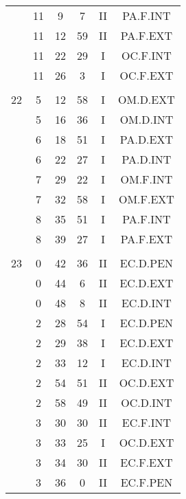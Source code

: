 \documentclass[12pt, a4paper]{article}
\begin{document}
\begin{multicols}{3}
{\begin{tabular}{c c c c c c}
	 	 	 	 & 11 & 9 & 7 & II & PA.F.INT\\%
	 	 	 	 & 11 & 12 & 59 & II & PA.F.EXT\\%
	 	 	 	 & 11 & 22 & 29 & I & OC.F.INT\\%
	 	 	 	 & 11 & 26 & 3 & I & OC.F.EXT\\%
	 	 	 	 & & & & & \\%
	 	 	 	22 & 5 & 12 & 58 & I & OM.D.EXT\\%
	 	 	 	 & 5 & 16 & 36 & I & OM.D.INT\\%
	 	 	 	 & 6 & 18 & 51 & I & PA.D.EXT\\%
	 	 	 	 & 6 & 22 & 27 & I & PA.D.INT\\%
	 	 	 	 & 7 & 29 & 22 & I & OM.F.INT\\%
	 	 	 	 & 7 & 32 & 58 & I & OM.F.EXT\\%
	 	 	 	 & 8 & 35 & 51 & I & PA.F.INT\\%
	 	 	 	 & 8 & 39 & 27 & I & PA.F.EXT\\%
	 	 	 	 & & & & & \\%
	 	 	 	23 & 0 & 42 & 36 & II & EC.D.PEN\\%
	 	 	 	 & 0 & 44 & 6 & II & EC.D.EXT\\%
	 	 	 	 & 0 & 48 & 8 & II & EC.D.INT\\%
	 	 	 	 & 2 & 28 & 54 & I & EC.D.PEN\\%
	 	 	 	 & 2 & 29 & 38 & I & EC.D.EXT\\%
	 	 	 	 & 2 & 33 & 12 & I & EC.D.INT\\%
	 	 	 	 & 2 & 54 & 51 & II & OC.D.EXT\\%
	 	 	 	 & 2 & 58 & 49 & II & OC.D.INT\\%
	 	 	 	 & 3 & 30 & 30 & II & EC.F.INT\\%
	 	 	 	 & 3 & 33 & 25 & I & OC.D.EXT\\%
	 	 	 	 & 3 & 34 & 30 & II & EC.F.EXT\\%
	 	 	 	 & 3 & 36 & 0 & II & EC.F.PEN\\%
	 	 \end{tabular}
 	}
\end{multicols}
\end{document}

